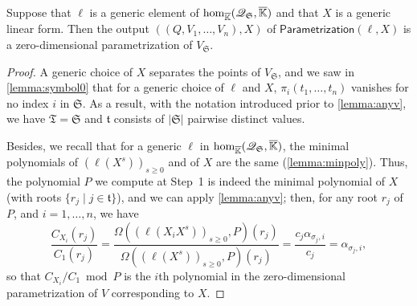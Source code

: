 \documentclass[12pt]{article}
\newcommand{\minpoly}{P}
\newcommand{\lf}{X}
\newcommand{\residueI}{\mathscr{Q}}
\newcommand{\sqfree}{Q}
\def\Kbar {{\ensuremath{\overline{\mathbb{K}}}}}
\begin{document}
\begin{lemma}\label{lemma:para2}
  Suppose that $\ell$ is a generic element of ${\rm
    hom}_{\Kbar}(\residueI_\mathfrak{S},\Kbar)$ and that $\lf$ is a generic
  linear form. Then the output $((\sqfree,V_1,\dots,V_n),\lf)$ of
  $\mathsf{Parametrization}(\ell,\lf)$ is a zero-dimensional
  parametrization of $V_{\mathfrak{S}}$.
\end{lemma}
\begin{proof}
  A generic choice of $\lf$ separates the points of
  $V_{\mathfrak{S}}$, and we saw in \cref{lemma:symbol0} that for a
  generic choice of $\ell$ and $\lf$, $\pi_i(t_1,\dots,t_n)$ vanishes
  for no index $i$ in $\mathfrak{S}$.  As a result, with the notation
  introduced prior to \cref{lemma:anyv}, we have
  $\mathfrak{T}=\mathfrak{S}$ and $\mathfrak{t}$ consists of
  $|\mathfrak{S}|$ pairwise distinct values.

  Besides, we recall that for a generic $\ell$ in ${\rm
    hom}_{\Kbar}(\residueI_\mathfrak{S},\Kbar)$, the minimal polynomials of
  $(\ell(\lf^s))_{s \ge 0}$ and of $\lf$ are the same
  (\cref{lemma:minpoly}).  Thus, the polynomial $\minpoly$ we compute
  at Step~1 is indeed the minimal polynomial of $\lf$ (with roots
  $\{r_j \mid j \in \mathfrak{t}\}$), and we can apply \cref{lemma:anyv};
  then, for any root $r_j$ of $\minpoly$, and $i=1,\dots,n$, we
  have
  $$\frac{ C_{X_i}(r_j)}{ C_1(r_j)} = \frac{\Omega((\ell(X_i
    \lf^s))_{s\ge0}, \minpoly)(r_j)}{\Omega((\ell(\lf^s))_{s\ge0} ,\minpoly)(r_j)}=
  \frac{c_j \alpha_{\sigma_j,i}}{c_j} = \alpha_{\sigma_j,i},$$ so that
  $ C_{X_i}/ C_1 \bmod P$ is the $i$th polynomial in the
  zero-dimensional parametrization of $V$ corresponding to $\lf$.
\end{proof}
\end{document}
